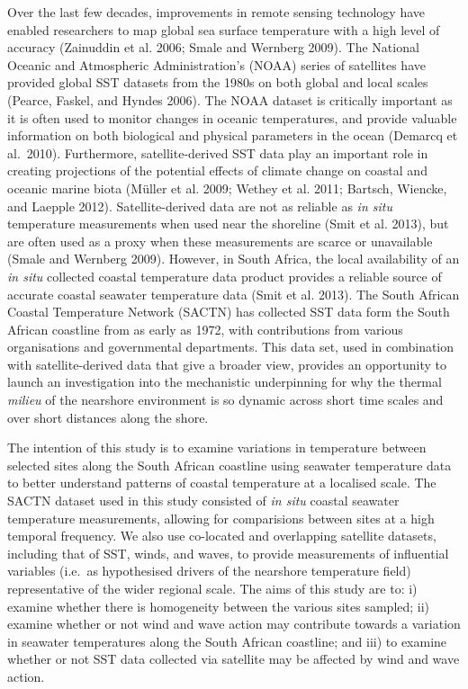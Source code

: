 \documentclass[10pt,a4paper,]{article}
\begin{document}
Over the last few decades, improvements in remote sensing technology
have enabled researchers to map global sea surface temperature with a
high level of accuracy (Zainuddin et al. 2006; Smale and Wernberg 2009).
The National Oceanic and Atmospheric Administration's (NOAA) series of
satellites have provided global SST datasets from the 1980s on both
global and local scales (Pearce, Faskel, and Hyndes 2006). The NOAA
dataset is critically important as it is often used to monitor changes
in oceanic temperatures, and provide valuable information on both
biological and physical parameters in the ocean (Demarcq et al.~2010).
Furthermore, satellite-derived SST data play an important role in
creating projections of the potential effects of climate change on
coastal and oceanic marine biota (Müller et al. 2009; Wethey et al.
2011; Bartsch, Wiencke, and Laepple 2012). Satellite-derived data are
not as reliable as \emph{in situ} temperature measurements when used
near the shoreline (Smit et al. 2013), but are often used as a proxy
when these measurements are scarce or unavailable (Smale and Wernberg
2009). However, in South Africa, the local availability of an \emph{in
situ} collected coastal temperature data product provides a reliable
source of accurate coastal seawater temperature data (Smit et al. 2013).
The South African Coastal Temperature Network (SACTN) has collected SST
data form the South African coastline from as early as 1972, with
contributions from various organisations and governmental departments.
This data set, used in combination with satellite-derived data that give
a broader view, provides an opportunity to launch an investigation into
the mechanistic underpinning for why the thermal \emph{milieu} of the
nearshore environment is so dynamic across short time scales and over
short distances along the shore.

The intention of this study is to examine variations in temperature
between selected sites along the South African coastline using seawater
temperature data to better understand patterns of coastal temperature at
a localised scale. The SACTN dataset used in this study consisted of
\emph{in situ} coastal seawater temperature measurements, allowing for
comparisions between sites at a high temporal frequency. We also use
co-located and overlapping satellite datasets, including that of SST,
winds, and waves, to provide measurements of influential variables
(i.e.~as hypothesised drivers of the nearshore temperature field)
representative of the wider regional scale. The aims of this study are
to: i) examine whether there is homogeneity between the various sites
sampled; ii) examine whether or not wind and wave action may contribute
towards a variation in seawater temperatures along the South African
coastline; and iii) to examine whether or not SST data collected via
satellite may be affected by wind and wave action.
\end{document}
